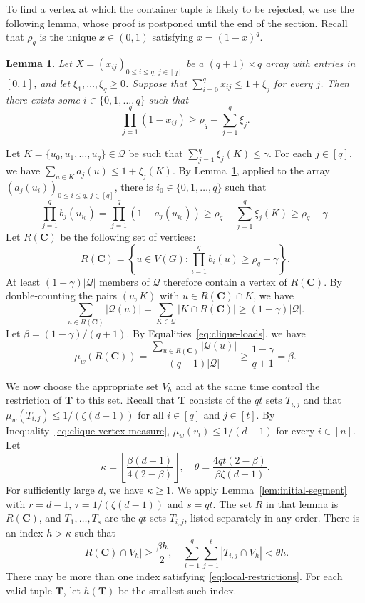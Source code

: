 \documentclass[12pt]{article}
\numberwithin{equation}{section}
\newtheorem{lemma}[theorem]{Lemma}
\theoremstyle{definition}
\begin{document}
To find a vertex at which the container tuple is likely to be rejected, we
use the following lemma, whose proof is postponed until the end of the
section. Recall that $\rho_q$ is the unique $x\in(0,1)$ satisfying
$x=(1-x)^q$.

\begin{lemma}\label{lem:robust-array}
Let $X=(x_{ij})_{0\leq i\leq q,\,j\in[q]}$ be a $(q+1)\times q$ array with
entries in $[0,1]$, and let
$\xi_1,\ldots,\xi_q \geq 0$. Suppose that
$\sum_{i = 0}^q x_{ij} \leq 1 + \xi_j$ for every $j$. Then there exists some 
$i \in \{0,1,\ldots,q\}$ such that
\[
 \prod_{j = 1}^q(1 - x_{ij}) \geq \rho_q - \sum_{j = 1}^q\xi_j.
\]
\end{lemma} 

Let $K = \{u_0,u_1,\ldots,u_q\} \in \mathcal Q$ be such that
$\sum_{j = 1}^q \xi_j(K) \leq \gamma$. For each $j \in [q]$, we have
$\sum_{u \in K} a_j(u) \leq 1 + \xi_j(K)$. By
Lemma~\ref{lem:robust-array}, applied to the array
$(a_j(u_i))_{0 \leq i \leq q,\,j \in [q]}$, there is
$i_0 \in \{0,1,\ldots,q\}$ such that
\[
 \prod_{j = 1}^q b_j(u_{i_0})
 = \prod_{j = 1}^q(1 - a_j(u_{i_0}))
 \geq \rho_q - \sum_{j = 1}^q \xi_j(K)
 \geq \rho_q - \gamma.
\]
Let $R(\mathbf C)$ be the following set of vertices:
\[
 R(\mathbf{C})
 = \left\{u \in V(G) : \prod_{i = 1}^q b_i(u)
 \geq \rho_q - \gamma\right\}.
\]
At least $(1 - \gamma)|\mathcal Q|$ members of $\mathcal Q$ therefore
contain a vertex of $R(\mathbf{C})$. By double-counting the pairs $(u,K)$ with
$u\in R(\mathbf C)\cap K$, we have
\[
\sum_{u\in R(\mathbf C)}|\mathcal Q(u)|
=\sum_{K\in\mathcal Q}|K\cap R(\mathbf C)|
\geq(1-\gamma)|\mathcal Q|.
\]
Let $\beta = (1 - \gamma)/(q + 1)$.
By Equalities~\eqref{eq:clique-loads}, we have
\[
 \mu_w(R(\mathbf{C}))
 = \frac{\sum_{u \in R(\mathbf{C})}|\mathcal Q(u)|}
 {(q + 1)|\mathcal Q|}
 \geq \frac{1 - \gamma}{q + 1} = \beta.
\]

We now choose the appropriate set $V_h$ and at the same time control the
restriction of $\mathbf{T}$ to this set.
Recall that $\mathbf{T}$ consists of the $qt$ sets $T_{i,j}$ and that
$\mu_w(T_{i,j}) \leq 1/(\zeta(d - 1))$ for all $i \in [q]$ and $j \in [t]$. By
Inequality~\eqref{eq:clique-vertex-measure},
$\mu_w(v_i) \leq 1/(d - 1)$ for every $i\in[n]$. Let
\[
 \kappa = \left\lfloor\frac{\beta(d - 1)}{4(2 - \beta)}\right\rfloor,
 \quad
 \theta = \frac{4qt(2 - \beta)}{\beta\zeta(d - 1)}.
\]
For sufficiently large $d$, we have $\kappa \geq 1$. We apply
Lemma~\ref{lem:initial-segment} with $r = d - 1$,
$\tau = 1/(\zeta(d - 1))$ and $s = qt$. The set $R$ in that lemma is
$R(\mathbf C)$, and $T_1,\ldots,T_s$ are the $qt$ sets $T_{i,j}$, listed
separately in any order. There is an index
$h > \kappa$ such that
\begin{equation}\label{eq:local-restrictions}
 |R(\mathbf{C}) \cap V_h| \geq \frac{\beta h}{2},
 \quad
 \sum_{i = 1}^q \sum_{j = 1}^t |T_{i,j} \cap V_h| < \theta h.
\end{equation}
There may be more than one index satisfying~\eqref{eq:local-restrictions}.
For each valid tuple $\mathbf{T}$, let $h(\mathbf{T})$ be the smallest such
index.
\end{document}
